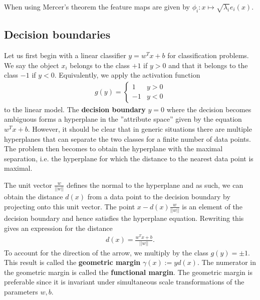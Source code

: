 {    
    When using Mercer's theorem the feature maps are given by $\phi_i:x\mapsto\sqrt{\lambda_i}e_i(x)$.

\subsection{Decision boundaries}

    Let us first begin with a linear classifier $y = w^Tx + b$ for classification problems. We say the object $x_i$ belongs to the class $+1$ if $y>0$ and that it belongs to the class $-1$ if $y<0$. Equivalently, we apply the activation function
    \begin{gather}
        g(y) =
        \begin{cases}
            1&y>0\\
            -1&y<0
        \end{cases}
    \end{gather}
    to the linear model. The \textbf{decision boundary} $y=0$ where the decision becomes ambiguous forms a hyperplane in the ''attribute space'' given by the equation $w^Tx+b$. However, it should be clear that in generic situations there are multiple hyperplanes that can separate the two classes for a finite number of data points. The problem then becomes to obtain the hyperplane with the maximal separation, i.e. the hyperplane for which the distance to the nearest data point is maximal.

    The unit vector $\frac{w}{||w||}$ defines the normal to the hyperplane and as such, we can obtain the distance $d(x)$ from a data point to the decision boundary by projecting onto this unit vector. The point $x - d(x)\frac{w}{||w||}$ is an element of the decision boundary and hence satisfies the hyperplane equation. Rewriting this gives an expression for the distance
    \begin{gather}
        d(x) = \frac{w^Tx + b}{||w||}.
    \end{gather}
    To account for the direction of the arrow, we multiply by the class $g(y)=\pm1$. This result is called the \textbf{geometric margin} $\gamma(x):=yd(x)$. The numerator in the geometric margin is called the \textbf{functional margin}. The geometric margin is preferable since it is invariant under simultaneous scale transformations of the parameters $w,b$.

}
